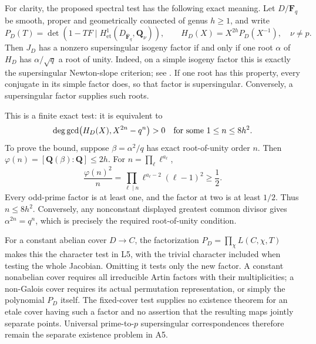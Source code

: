 \documentclass[11pt]{article}
\begin{document}
For clarity, the proposed spectral test has the following exact
meaning. Let $D/\mathbf F_q$ be smooth, proper and geometrically
connected of genus $h\ge1$, and write
\[
 P_D(T)=\det(1-TF\mid H^1_{\mathrm{et}}
       (D_{\overline{\mathbf F}_q},\mathbf Q_\nu)),
 \qquad
 H_D(X)=X^{2h}P_D(X^{-1}),\quad \nu\ne p.
\]
Then $J_D$ has a nonzero supersingular isogeny factor if and
only if one root $\alpha$ of $H_D$ has
$\alpha/\sqrt q$ a root of unity. Indeed, on a simple
isogeny factor this is exactly the supersingular
Newton-slope criterion; see
\cite[\S\S21.20--21.21(3)]{AC_Oort2008}. If one root has
this property, every conjugate in its simple factor does,
so that factor is supersingular. Conversely, a
supersingular factor supplies such roots.

This is a finite exact test: it is equivalent to
\[
 \deg\gcd\bigl(H_D(X),X^{2n}-q^n\bigr)>0
 \quad\hbox{for some }1\le n\le8h^2.
\]
To prove the bound, suppose $\beta=\alpha^2/q$ has exact
root-of-unity order $n$. Then
$\varphi(n)=[\mathbf Q(\beta):\mathbf Q]\le2h$.
For $n=\prod_\ell\ell^{a_\ell}$,
\[
 \frac{\varphi(n)^2}{n}
       =\prod_{\ell\mid n}\ell^{a_\ell-2}(\ell-1)^2
       \ge\frac12.
\]
Every odd-prime factor is at least one, and the factor
at two is at least $1/2$. Thus $n\le8h^2$.
Conversely, any nonconstant displayed greatest common
divisor gives $\alpha^{2n}=q^n$, which is precisely the
required root-of-unity condition.

For a constant abelian cover $D\to C$, the factorization
$P_D=\prod_\chi L(C,\chi,T)$ makes this the character
test in L5, with the trivial character included when
testing the whole Jacobian. Omitting it tests only the
new factor. A constant nonabelian cover requires all
irreducible Artin factors with their multiplicities;
a non-Galois cover requires its actual permutation
representation, or simply the polynomial $P_D$ itself.
The fixed-cover test supplies no existence theorem for
an etale cover having such a factor and no assertion
that the resulting maps jointly separate points.
Universal prime-to-$p$ supersingular correspondences
therefore remain the separate existence problem in A5.
\end{document}
